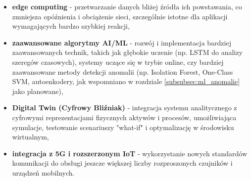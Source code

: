 \begin{itemize}
    \item \textbf{edge computing} - przetwarzanie danych bliżej źródła ich powstawania, co zmniejsza opóźnienia i obciążenie sieci, szczególnie istotne dla aplikacji wymagających bardzo szybkiej reakcji,
    \item \textbf{zaawansowane algorytmy AI/ML} - rozwój i implementacja bardziej zaawansowanych technik, takich jak głębokie uczenie (np. LSTM do analizy szeregów czasowych), systemy uczące się w trybie online, czy bardziej zaawansowane metody detekcji anomalii (np. Isolation Forest, One-Class SVM, autoenkodery, jak wspomniano w rozdziale \ref{subsubsec:ml_anomalie} jako planowane),
    \item \textbf{Digital Twin (Cyfrowy Bliźniak)} - integracja systemu analitycznego z cyfrowymi reprezentacjami fizycznych aktywów i procesów, umożliwiająca symulacje, testowanie scenariuszy "what-if" i optymalizację w środowisku wirtualnym,
    \item \textbf{integracja z 5G i rozszerzonym IoT} - wykorzystanie nowych standardów komunikacji do obsługi jeszcze większej liczby rozproszonych czujników i urządzeń mobilnych.
\end{itemize}